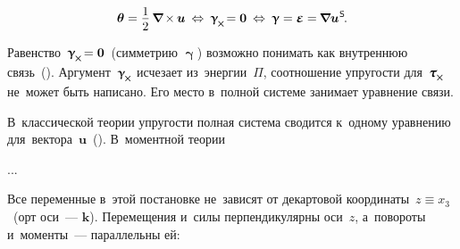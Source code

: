 \begin{otherlanguage}{russian}
\nopagebreak\vspace{-0.75em}\begin{equation}
\bm{\theta} = \displaystyle \onehalf \hspace{0.4ex} \boldnabla \hspace{-0.16ex} \times \hspace{-0.1ex} \bm{u} 
\:\Leftrightarrow\:
\bm{\upgamma}_{\hspace{-0.16ex}\Xcompanion} \hspace{-0.32ex} = \bm{0}
\:\Leftrightarrow\:
\bm{\upgamma} = \mathboldepsilon = \hspace{-0.12ex} \boldnabla {\bm{u}}^{\hspace{0.1ex}\mathsf{S}} \hspace{-0.25ex}.
\end{equation}

Равенство~${\bm{\upgamma}_{\hspace{-0.16ex}\Xcompanion} \hspace{-0.32ex} = \bm{0}}$~(симметрию $\bm{\upgamma}$) возможно понимать как внутреннюю связь~(). Аргумент~${\bm{\upgamma}_{\hspace{-0.16ex}\Xcompanion}}$ исчезает из~энергии~$\Pi$, соотношение упругости для~${\mathboldtau_{\hspace{-0.1ex}\Xcompanion}}$ не~может быть написано. Его место в~полной системе занимает уравнение связи.

В~классической теории упругости полная система сводится к~одному уравнению для~вектора~$\bm{u}$~(). В~моментной теории

...





\label{para:planedeformation.cosseratcontinuum}

Все переменные в~этой постановке не~зависят от декартовой координаты~${z \equiv x_3}$~(орт оси~--- $\bm{k}$). Перемещения и~силы перпендикулярны оси~$z$, а~повороты и~моменты~--- параллельны ей:


\end{otherlanguage}
